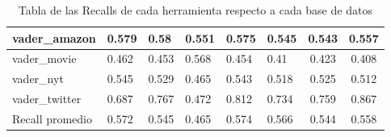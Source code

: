 \begin{table} [H]
{\begin{tabular}{|llllb{1.5cm}b{1.5cm}cc|}
			vader\_amazon & 0.579 & \cellcolor{greentable} 0.58 & 0.551 & 0.575 & 0.545 & 0.543 & 0.557 \\ \hline
			vader\_movie & 0.462 & 0.453 & \cellcolor{greentable} 0.568 & 0.454 & 0.41 & 0.423 & 0.408 \\ \hline
			vader\_nyt &  \cellcolor{greentable}0.545 & 0.529 & 0.465 & 0.543 & 0.518 & 0.525 & 0.512 \\ \hline
			vader\_twitter &0.687 & 0.767 & 0.472 & 0.812 & 0.734 & 0.759 & \cellcolor{greentable} 0.867 \\ \hline
			Recall promedio &  0.572 & 0.545 & 0.465 &\cellcolor{greentable} 0.574 & 0.566 & 0.544 & 0.558 \\ \hline
		\end{tabular}
	}
	\caption{Tabla de las Recalls de cada herramienta respecto a cada base de datos}
	\label{table:recalls}
\end{table}

